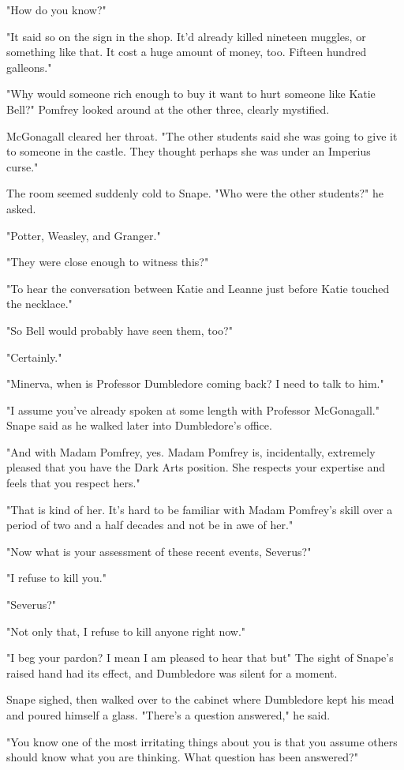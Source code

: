 "How do you know?"

"It said so on the sign in the shop. It'd already killed nineteen muggles, or something like that. It cost a huge amount of money, too. Fifteen hundred galleons."

"Why would someone rich enough to buy it want to hurt someone like Katie Bell?" Pomfrey looked around at the other three, clearly mystified.

McGonagall cleared her throat. "The other students said she was going to give it to someone in the castle. They thought perhaps she was under an Imperius curse."

The room seemed suddenly cold to Snape. "Who were the other students?" he asked.

"Potter, Weasley, and Granger."

"They were close enough to witness this?"

"To hear the conversation between Katie and Leanne just before Katie touched the necklace."

"So Bell would probably have seen them, too?"

"Certainly."

"Minerva, when is Professor Dumbledore coming back? I need to talk to him."

"I assume you've already spoken at some length with Professor McGonagall." Snape said as he walked later into Dumbledore's office.

"And with Madam Pomfrey, yes. Madam Pomfrey is, incidentally, extremely pleased that you have the Dark Arts position. She respects your expertise and feels that you respect hers."

"That is kind of her. It's hard to be familiar with Madam Pomfrey's skill over a period of two and a half decades and not be in awe of her."

"Now what is your assessment of these recent events, Severus?"

"I refuse to kill you."

"Severus?"

"Not only that, I refuse to kill anyone right now."

"I beg your pardon? I mean I am pleased to hear that but{\el}" The sight of Snape's raised hand had its effect, and Dumbledore was silent for a moment.

Snape sighed, then walked over to the cabinet where Dumbledore kept his mead and poured himself a glass. "There's a question answered," he said.

"You know one of the most irritating things about you is that you assume others should know what you are thinking. What question has been answered?"

